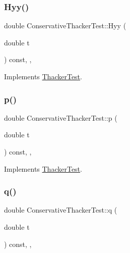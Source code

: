 \subsubsection{\texorpdfstring{Hyy()}{Hyy()}}
{\footnotesize\ttfamily double Conservative\+Thacker\+Test\+::\+Hyy (\begin{DoxyParamCaption}\item[{double}]{t }\end{DoxyParamCaption}) const\hspace{0.3cm}{\ttfamily [inline]}, {\ttfamily [override]}, {\ttfamily [virtual]}}



Implements \hyperlink{classThackerTest_a4cdc886e1127e7f160cae4ed8e49f2d7}{Thacker\+Test}.

\mbox{\label{classConservativeThackerTest_a86df7e9b8603fbdc5a00341f27428a70}} 
\subsubsection{\texorpdfstring{p()}{p()}}
{\footnotesize\ttfamily double Conservative\+Thacker\+Test\+::p (\begin{DoxyParamCaption}\item[{double}]{t }\end{DoxyParamCaption}) const\hspace{0.3cm}{\ttfamily [inline]}, {\ttfamily [override]}, {\ttfamily [virtual]}}



Implements \hyperlink{classThackerTest_a9174c2c16088c48c1ece4356289e4a6c}{Thacker\+Test}.

\mbox{\label{classConservativeThackerTest_a04b3e568727e6ccbfbe5ee13e08cd69c}} 
\subsubsection{\texorpdfstring{q()}{q()}}
{\footnotesize\ttfamily double Conservative\+Thacker\+Test\+::q (\begin{DoxyParamCaption}\item[{double}]{t }\end{DoxyParamCaption}) const\hspace{0.3cm}{\ttfamily [inline]}, {\ttfamily [override]}, {\ttfamily [virtual]}}



